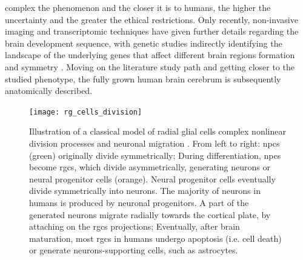 complex the phenomenon and the closer it is to humans, the higher the uncertainty and the greater the ethical restrictions. Only recently, non-invasive imaging and transcriptomic techniques have given further details regarding the brain development sequence, with genetic studies indirectly identifying the landscape of the underlying genes that affect different brain regions formation and symmetry \cite{Cara2022}. Moving on the literature study path and getting closer to the studied phenotype, the fully grown human brain cerebrum is subsequently anatomically described.

\begin{figure}
	\centering
	\texttt{[image: rg\_cells\_division]}\\
	\caption[A classical model of radial glial cells division processes \cite{Rakic2009}]{Illustration of a classical model of radial glial cells complex nonlinear division processes and neuronal migration \cite{Rakic2009}. From left to right: \acsp{npc} (green) originally divide symmetrically; During differentiation, \acsp{npc} become \acsp{rgc}, which divide asymmetrically, generating neurons or neural progenitor cells (orange). Neural progenitor cells eventually divide symmetrically into neurons. The majority of neurons in humans is produced by neuronal progenitors. A part of the generated neurons migrate radially towards the cortical plate, by attaching on the \acsp{rgc} projections; Eventually, after brain maturation, most \acsp{rgc} in humans undergo apoptosis (i.e. cell death) or generate neurons-supporting cells, such as astrocytes.}
	\label{fig:rgc}
\end{figure}


